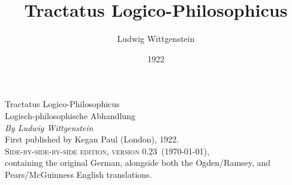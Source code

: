 \documentclass[oneside,openany,12pt]{book}
\title{Tractatus Logico-Philosophicus}
\author{Ludwig Wittgenstein}
\date{1922}
\newcommand{\version}{0.23}
\begin{document}
\sloppy
\begin{titlepage}
\begin{center}
\vspace*{2in}
{\Huge Tractatus Logico-Philosophicus}\\[20pt]
{\LARGE Logisch-philosophische Abhandlung}\\[30pt]
{\Large \textit{By Ludwig Wittgenstein}}\\[90pt]
{First published by Kegan Paul (London), 1922.}\\[20pt]
{\textsc{Side-by-side-by-side edition, version \version\ (\today),}}\\
{containing the original German, alongside both the
Ogden/Ramsey, and Pears/McGuinness English translations.}
\end{center}
\end{titlepage}
\setlength{\parskip}{0pt}
\clearpage{}%
\end{document}
